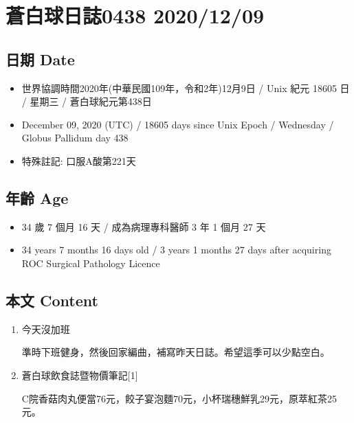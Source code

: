\documentclass[a5paper, 10pt
]{book}
\providecommand{\tightlist}{%
  \setlength{\itemsep}{0pt}\setlength{\parskip}{0pt}}
\begin{document}
\hypertarget{ux84bcux767dux7403ux65e5ux8a8c0438-20201209}{%
\section{蒼白球日誌0438
2020/12/09}\label{ux84bcux767dux7403ux65e5ux8a8c0438-20201209}}

\hypertarget{ux65e5ux671f-date-8}{%
\subsection{日期 Date}\label{ux65e5ux671f-date-8}}

\begin{itemize}
\tightlist
\item
  世界協調時間2020年(中華民國109年，令和2年)12月9日 / Unix 紀元 18605 日
  / 星期三 / 蒼白球紀元第438日
\item
  December 09, 2020 (UTC) / 18605 days since Unix Epoch / Wednesday /
  Globus Pallidum day 438
\item
  特殊註記: 口服A酸第221天
\end{itemize}

\hypertarget{ux5e74ux9f61-age-8}{%
\subsection{年齡 Age}\label{ux5e74ux9f61-age-8}}

\begin{itemize}
\tightlist
\item
  34 歲 7 個月 16 天 / 成為病理專科醫師 3 年 1 個月 27 天
\item
  34 years 7 months 16 days old / 3 years 1 months 27 days after
  acquiring ROC Surgical Pathology Licence
\end{itemize}

\hypertarget{ux672cux6587-content-8}{%
\subsection{本文 Content}\label{ux672cux6587-content-8}}

\begin{enumerate}
\def\labelenumi{\arabic{enumi}.}
\item
  今天沒加班

  準時下班健身，然後回家編曲，補寫昨天日誌。希望這季可以少點空白。
\item
  蒼白球飲食誌暨物價筆記{[}1{]}

  C院香菇肉丸便當76元，餃子宴泡麵70元，小杯瑞穗鮮乳29元，原萃紅茶25元。
\end{enumerate}
\end{document}
